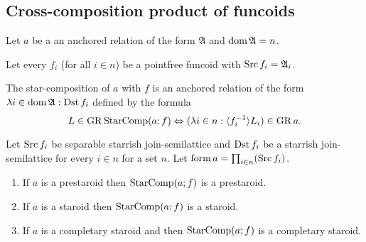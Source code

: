 \subsection{Cross-composition product of funcoids}

Let $a$ be a an anchored relation of the form $\mathfrak{A}$ and
$\operatorname{dom}\mathfrak{A}=n$.

Let every $f_{i}$ (for all $i\in n$) be a pointfree funcoid with
$\operatorname{Src} f_{i}=\mathfrak{A}_{i}$.

The star-composition of $a$ with $f$ is an anchored relation of
the form $\lambda i\in\operatorname{dom}\mathfrak{A}:\operatorname{Dst} f_{i}$ defined by the
formula 
\[
L\in\operatorname{GR}\operatorname{StarComp}(a;f)\Leftrightarrow(\lambda i\in n:\langle f_{i}^{-1}\rangle L_{i})\in\operatorname{GR} a.
\]

\begin{thm}
Let $\operatorname{Src} f_{i}$ be separable starrish join-semilattice and $\operatorname{Dst} f_{i}$
be a starrish join-semilattice for every $i\in n$ for a set $n$.
Let $\operatorname{form} a=\prod_{i\in n}(\operatorname{Src} f_{i})$.
\begin{enumerate}
\item \label{fcomp-pre}If $a$ is a prestaroid then $\operatorname{StarComp}(a;f)$ is
a prestaroid.
\item \label{fcomp-str}If $a$ is a staroid then $\operatorname{StarComp}(a;f)$ is a
staroid.
\item \label{fcomp-compl}If $a$ is a completary staroid and then $\operatorname{StarComp}(a;f)$
is a completary staroid.
\end{enumerate}
\end{thm}
